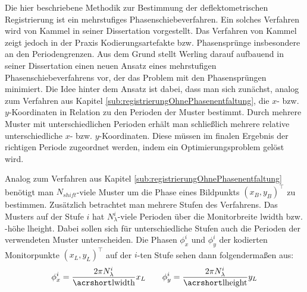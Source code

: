 Die hier beschriebene Methodik zur Bestimmung der deflektometrischen Registrierung ist ein mehrstufiges Phasenschiebeverfahren.
Ein solches Verfahren wird von Kammel in seiner Dissertation \cite{kit_kammel} vorgestellt.
Das Verfahren von Kammel zeigt jedoch in der Praxis Kodierungsartefakte bzw. Phasensprünge insbesondere an den Periodengrenzen.
Aus dem Grund stellt Werling darauf aufbauend in seiner Dissertation \cite{kit_werling} einen neuen Ansatz eines mehrstufigen Phasenschiebeverfahrens vor, der das Problem mit den Phasensprüngen minimiert.
Die Idee hinter dem Ansatz ist dabei, dass man sich zunächst, analog zum Verfahren aus Kapitel \ref{sub:registrierungOhnePhasenentfaltung}, die $x$- bzw. $y$-Koordinaten in Relation zu den Perioden der Muster bestimmt.
Durch mehrere Muster mit unterschiedlichen Perioden erhält man schließlich mehrere relative unterschiedliche $x$- bzw. $y$-Koordinaten.
Diese müssen im finalen Ergebnis der richtigen Periode zugeordnet werden, indem ein Optimierungsproblem gelöst wird.

\p
Analog zum Verfahren aus Kapitel \ref{sub:registrierungOhnePhasenentfaltung} benötigt man $N_{shift}$-viele Muster um die Phase eines Bildpunkts $(x_B, y_B)^\top$ zu bestimmen.
Zusätzlich betrachtet man mehrere Stufen des Verfahrens.
Das Musters auf der Stufe $i$ hat $N_\lambda^i$-viele Perioden über die Monitorbreite \acrshort{lwidth} bzw. -höhe \acrshort{lheight}.
Dabei sollen sich für unterschiedliche Stufen auch die Perioden der verwendeten Muster unterscheiden.
Die Phasen $\phi_x^i$ und $\phi_y^i$ der kodierten Monitorpunkte $(x_L, y_L)^\top$ auf der $i$-ten Stufe sehen dann folgendermaßen aus:
%
\begin{equation}
	\phi_x^i = \dfrac{2\pi N_\lambda^i}{\acrshortmath{lwidth}} x_L
	\qquad
	\phi_y^i = \dfrac{2\pi N_\lambda^i}{\acrshortmath{lheight}} y_L
\end{equation}

